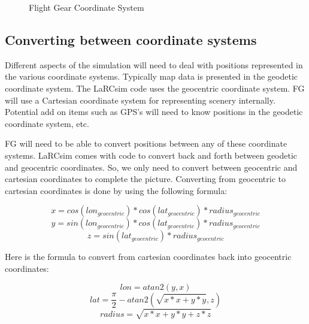 \documentclass[12pt]{article}
\begin{document}
\begin{figure}[hbt]
  \centerline{                   
  }
  \caption{Flight Gear Coordinate System}
  \label{fig:coords}
\end{figure}

\newpage

\subsection{Converting between coordinate systems}

Different aspects of the simulation will need to deal with positions
represented in the various coordinate systems.  Typically map data is
presented in the geodetic coordinate system.  The LaRCsim code uses
the geocentric coordinate system.  FG will use a Cartesian coordinate
system for representing scenery internally.  Potential add on items
such as GPS's will need to know positions in the geodetic coordinate
system, etc.

FG will need to be able to convert positions between any of these
coordinate systems.  LaRCsim comes with code to convert back and forth
between geodetic and geocentric coordinates.  So, we only need to
convert between geocentric and cartesian coordinates to complete the
picture.  Converting from geocentric to cartesian coordinates is done
by using the following formula:

\noindent
\[ x = cos(lon_\mathit{geocentric}) * cos(lat_\mathit{geocentric}) *
radius_\mathit{geocentric} \]
\[ y = sin(lon_\mathit{geocentric}) * cos(lat_\mathit{geocentric}) *
radius_\mathit{geocentric} \]
\[ z = sin(lat_\mathit{geocentric}) * radius_\mathit{geocentric} \]

Here is the formula to convert from cartesian coordinates back into
geocentric coordinates:

\noindent
\[ lon = atan2( y, x ) \]
\[ lat = \frac{\pi}{2} - atan2( \sqrt{x*x + y*y}, z ) \]
\[ radius = \sqrt{x*x + y*y + z*z} \]
\end{document}
